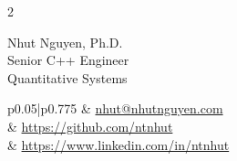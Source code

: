 \documentclass[11pt]{article} %
\begin{document}
\begin{paracol}{2}


\parbox[top][0.12\textheight][c]{\linewidth}{ %
	\vspace{-0.02\textheight} %
	\centering %
	{\sffamily\Huge Nhut Nguyen, Ph.D.}\\\medskip %
    \centering
    {\sffamily Senior C++ Engineer \\ Quantitative Systems} %
}

\switchcolumn %

\parbox[top][0.12\textheight][c]{\linewidth}{ %
	\vspace{-0.02\textheight} %
	\colorbox{shade}{ %
		\begin{supertabular}{p{0.05\linewidth}|p{0.775\linewidth}} %
			\raisebox{0pt}{\small\faEnvelope} & \href{mailto:nhut@nhutnguyen.com}{nhut@nhutnguyen.com} \\ %
			\raisebox{-1pt}{\faGithub} & \href{https://github.com/ntnhut}{https://github.com/ntnhut} \\ %
			\raisebox{-1pt}{\faLinkedinSquare} & \href{https://www.linkedin.com/in/ntnhut}{https://www.linkedin.com/in/ntnhut} \\ %
		\end{supertabular}
	}
}


\end{paracol}
\end{document}
